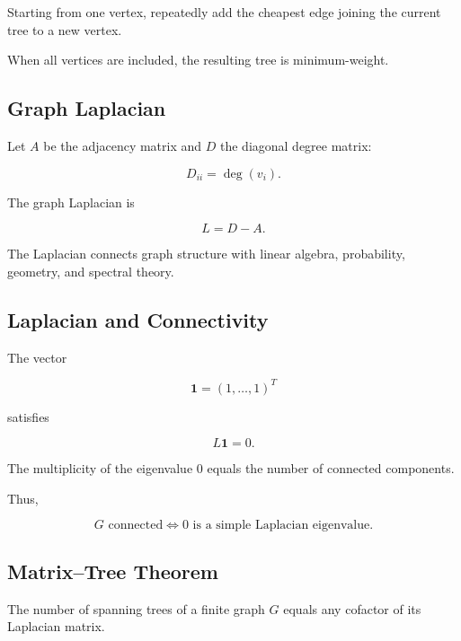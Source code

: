 Starting from one vertex, repeatedly add the cheapest edge joining the
current tree to a new vertex.

When all vertices are included, the resulting tree is minimum-weight.

\subsection{Graph Laplacian}
\label{subsec:graph-laplacian}

Let \(A\) be the adjacency matrix and \(D\) the diagonal degree matrix:

\[
D_{ii}=\deg(v_i).
\]

The graph Laplacian is

\[
\boxed{
L=D-A.
}
\]

The Laplacian connects graph structure with linear algebra,
probability, geometry, and spectral theory.

\subsection{Laplacian and Connectivity}
\label{subsec:laplacian-connectivity}

The vector

\[
\mathbf{1}
=
(1,\ldots,1)^T
\]

satisfies

\[
L\mathbf{1}=0.
\]

The multiplicity of the eigenvalue \(0\) equals the number of connected
components.

Thus,

\[
\boxed{
G\text{ connected}
\iff
0\text{ is a simple Laplacian eigenvalue}.
}
\]

\subsection{Matrix--Tree Theorem}
\label{subsec:matrix-tree-theorem}

\begin{theorem}
The number of spanning trees of a finite graph \(G\) equals any cofactor
of its Laplacian matrix.
\end{theorem}

